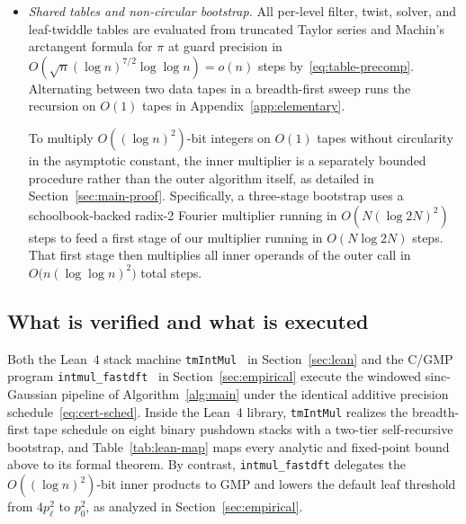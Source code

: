 \begin{itemize}[leftmargin=*,itemsep=2pt,parsep=0pt,topsep=3pt]
  \item \emph{Shared tables and non-circular bootstrap.} All per-level filter, twist, solver, and leaf-twiddle tables are evaluated from truncated Taylor series and Machin's arctangent formula for $\pi$ at guard precision in $O(\sqrt{n}(\log n)^{7/2}\allowbreak\log\log n) = o(n)$ steps by~\eqref{eq:table-precomp}. Alternating between two data tapes in a breadth-first sweep runs the recursion on $O(1)$ tapes in Appendix~\ref{app:elementary}.

  To multiply $O((\log n)^2)$-bit integers on $O(1)$ tapes without circularity in the asymptotic constant, the inner multiplier is a separately bounded procedure rather than the outer algorithm itself, as detailed in Section~\ref{sec:main-proof}. Specifically, a three-stage bootstrap uses a schoolbook-backed radix-2 Fourier multiplier running in $O(N(\log 2N)^2)$ steps to feed a first stage of our multiplier running in $O(N \log 2N)$ steps. That first stage then multiplies all inner operands of the outer call in $O\bigl(n(\log\log n)^2\bigr)$ total steps.
\end{itemize}

\subsection{What is verified and what is executed}\label{sec:overview-verified}

Both the Lean~4 stack machine \texttt{tmIntMul}~\cite{LeanMS26} in Section~\ref{sec:lean} and the C/GMP program \texttt{intmul\_fastdft}~\cite{CGMP26} in Section~\ref{sec:empirical} execute the windowed sinc-Gaussian pipeline of Algorithm~\ref{alg:main} under the identical additive precision schedule~\eqref{eq:cert-sched}. Inside the Lean~4 library, \texttt{tmIntMul} realizes the breadth-first tape schedule on eight binary pushdown stacks with a two-tier self-recursive bootstrap, and Table~\ref{tab:lean-map} maps every analytic and fixed-point bound above to its formal theorem. By contrast, \texttt{intmul\_fastdft} delegates the $O((\log n)^2)$-bit inner products to GMP and lowers the default leaf threshold from $4p_\ell^2$ to $p_0^2$, as analyzed in Section~\ref{sec:empirical}.
